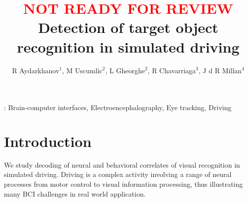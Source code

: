 \documentclass[12pt]{iopart}
\begin{document}
\title[]{\textcolor{red}{NOT READY FOR REVIEW} Detection of target object recognition in simulated driving}

\author{R Aydarkhanov$^1$,
M Uscumlic$^2$,
L Gheorghe$^2$,
R Chavarriaga$^3$,
J d R Millan$^4$}


\address{$^1$EPFL, Switzerland}
\address{$^2$EPFL, Switzerland}
\address{$^3$EPFL, Switzerland}
\address{$^4$TU Austin, USA}
\vspace{10pt}

\begin{abstract}
\end{abstract}

%
\vspace{2pc}
: Brain-computer interfaces, Electroencephalography, Eye tracking, Driving
%
%
% 
%




\section{Introduction}
\label{sec:intro}

We study decoding of neural and behavioral correlates 
of visual recognition in simulated driving.
Driving is a complex activity involving a range of neural processes from motor control
to visual information processing, thus illustrating
many BCI challenges in real world application.
\end{document}
